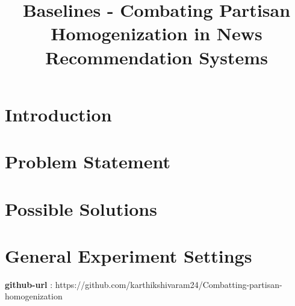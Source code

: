 \documentclass[a4paper,fontsize=8.0pt]{scrartcl}
\title{\textbf{Baselines - Combating Partisan Homogenization in News Recommendation Systems}}
\date{\vspace{-10ex}}
\begin{document}
\maketitle

\tableofcontents
\newpage
\section{Introduction}
\section{Problem Statement}
\section{Possible Solutions}
\newpage
\section{General Experiment Settings}
\textbf{github-url} : https://github.com/karthikshivaram24/Combatting-partisan-homogenization
\end{document}
